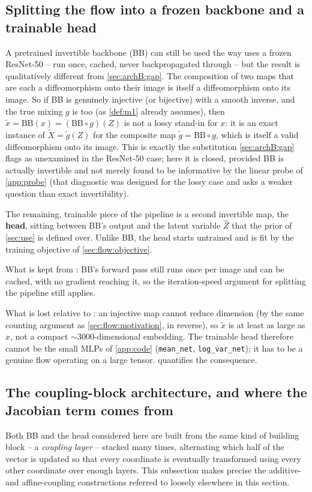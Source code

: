 \subsection{Splitting the flow into a frozen backbone and a trainable head}
\label{sec:flow:split}
A pretrained invertible backbone (BB) can still be used the way  uses a frozen
ResNet-50 -- run once, cached, never backpropagated through -- but the result is qualitatively different
from \cref{sec:archB:gap}. The composition of two maps that are each a diffeomorphism onto their image is
itself a diffeomorphism onto its image. So if BB is genuinely injective (or bijective) with a smooth
inverse, and the true mixing $g$ is too (as \cref{def:m1} already assumes), then
$\tilde x=\mathrm{BB}(x)=(\mathrm{BB}\circ g)(Z)$ is not a lossy stand-in for $x$: it is an exact instance
of $\tilde X=\tilde g(Z)$ for the composite map $\tilde g=\mathrm{BB}\circ g$, which is itself a valid
diffeomorphism onto its image. This is exactly the substitution \cref{sec:archB:gap} flags as unexamined
in the ResNet-50 case; here it is closed, provided BB is actually invertible and not merely found to be
informative by the linear probe of \cref{app:probe} (that diagnostic was designed for the lossy case and
asks a weaker question than exact invertibility).

The remaining, trainable piece of the pipeline is a second invertible map, the \textbf{head}, sitting
between BB's output and the latent variable $\hat Z$ that the prior of \cref{sec:use} is defined over.
Unlike BB, the head starts untrained and is fit by the training objective of \cref{sec:flow:objective}.

What is kept from : BB's forward pass still runs once per image and can be cached,
with no gradient reaching it, so the iteration-speed argument for splitting the pipeline still applies.

What is lost relative to : an injective map cannot reduce dimension (by the same
counting argument as \cref{sec:flow:motivation}, in reverse), so $\tilde x$ is at least as large as $x$,
not a compact $\sim\!3000$-dimensional embedding. The trainable head therefore cannot be the small MLPs
of \cref{app:code} (\texttt{mean\_net}, \texttt{log\_var\_net}); it has to be a genuine flow operating on
a large tensor.  quantifies the consequence.

\subsection{The coupling-block architecture, and where the Jacobian term comes from}
\label{sec:flow:coupling}
Both BB and the head considered here are built from the same kind of building block -- a
\emph{coupling layer} -- stacked many times, alternating which half of the vector is updated so that
every coordinate is eventually transformed using every other coordinate over enough layers. This
subsection makes precise the additive- and affine-coupling constructions referred to loosely elsewhere in
this section.

